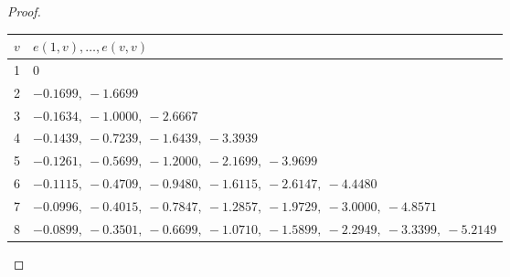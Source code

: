 \begin{proof}
\begin{center}
\begin{tabular}{c|l}
$v$ & $e(1,v),\dots,e(v,v)$\\\hline
1 & $0$\\
2 & $-0.1699,\ -1.6699$\\
3 & $-0.1634,\ -1.0000,\ -2.6667$\\
4 & $-0.1439,\ -0.7239,\ -1.6439,\ -3.3939$\\
5 & $-0.1261,\ -0.5699,\ -1.2000,\ -2.1699,\ -3.9699$\\
6 & $-0.1115,\ -0.4709,\ -0.9480,\ -1.6115,\ -2.6147,\ -4.4480$\\
7 & $-0.0996,\ -0.4015,\ -0.7847,\ -1.2857,\ -1.9729,\ -3.0000,\ -4.8571$\\
8 & $-0.0899,\ -0.3501,\ -0.6699,\ -1.0710,\ -1.5899,\ -2.2949,\ -3.3399,\ -5.2149$
\end{tabular}
\end{center}
\end{proof}


